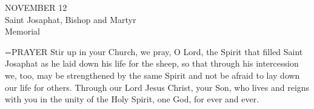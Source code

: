 \begin{center}\normalsize NOVEMBER 12\\
\footnotesize Saint Josaphat, Bishop and Martyr\\
\footnotesize Memorial\\
\end{center}

\hangindent=\parindent \small{PRAYER 
Stir up in your Church, we pray, O Lord,
the Spirit that filled Saint Josaphat
as he laid down his life for the sheep,
so that through his intercession
we, too, may be strengthened by the same Spirit
and not be afraid to lay down our life for others.
Through our Lord Jesus Christ, your Son,
who lives and reigns with you in the unity of the Holy Spirit,
one God, for ever and ever.\\}
 
